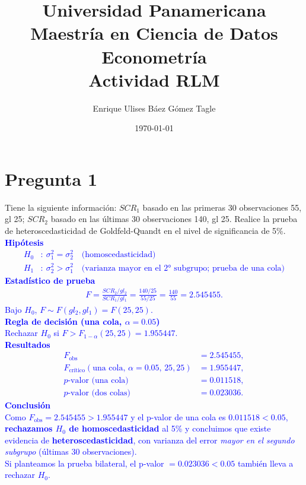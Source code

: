 \documentclass[10pt]{article}
\title{Universidad Panamericana \\ Maestría en Ciencia de Datos \\ Econometría \\ \vspace{0.5cm} Actividad RLM}
\author{Enrique Ulises Báez Gómez Tagle}
\date{\today}
\begin{document}
\maketitle

\tableofcontents

\newpage
\section{Pregunta 1}
Tiene la siguiente información: $SCR_1$ basado en las primeras 30 observaciones 55, gl 25; $SCR_2$ basado en las últimas 30 observaciones 140, gl 25. Realice la prueba de heteroscedasticidad de Goldfeld-Quandt en el nivel de significancia de 5\%. \\
    \textcolor{blue}{
        \textbf{Hipótesis}
        \begin{align*}
            H_0&:\ \sigma_1^2=\sigma_2^2\quad\text{(homoscedasticidad)}\\
            H_1&:\ \sigma_2^2>\sigma_1^2\quad\text{(varianza mayor en el 2° subgrupo; prueba de una cola)}
        \end{align*}
        \vspace{0.2cm}
        \textbf{Estadístico de prueba}
        \begin{align*}
        F 
        = \frac{SCR_2/gl_2}{SCR_1/gl_1}
        = \frac{140/25}{55/25}
        = \frac{140}{55}
        = 2.545455.
        \end{align*}
        Bajo $H_0$, $F\sim F(gl_2,gl_1)=F(25,25)$.
        \vspace{0.2cm}\\
        \textbf{Regla de decisión (una cola, $\alpha=0.05$)}\\
        Rechazar $H_0$ si $F>F_{1-\alpha}(25,25)=1.955447$.
        \vspace{0.2cm}\\
        \textbf{Resultados}
        \begin{align*}
        F_{\text{obs}}&=2.545455,\\
        F_{\text{crítico}}(\text{una cola},\,\alpha=0.05,\,25,25)&=1.955447,\\
        p\text{-valor (una cola)}&=0.011518,\\
        p\text{-valor (dos colas)}&=0.023036.
        \end{align*}
        \vspace{0.2cm}
        \textbf{Conclusión}\\
        Como $F_{\text{obs}}=2.545455>1.955447$ y el p-valor de una cola es $0.011518<0.05$, \textbf{rechazamos $H_0$ de homoscedasticidad} al 5\% y concluimos que existe evidencia de \textbf{heteroscedasticidad}, con varianza del error \emph{mayor en el segundo subgrupo} (últimas 30 observaciones).\\
        Si planteamos la prueba bilateral, el p-valor $=0.023036<0.05$ también lleva a rechazar $H_0$.
    }
\end{document}
